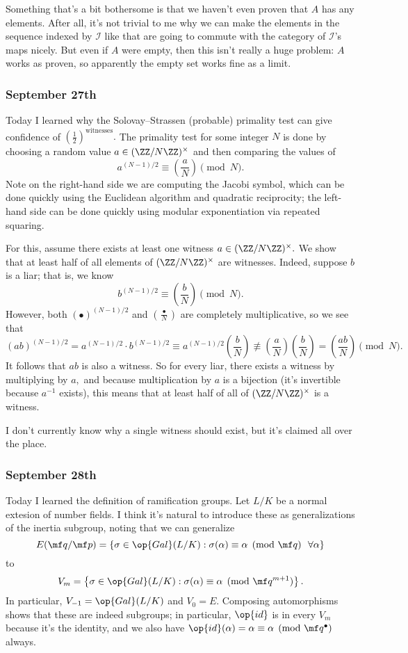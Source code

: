 Something that's a bit bothersome is that we haven't even proven that $A$ has any elements. After all, it's not trivial to me why we can make the elements in the sequence indexed by $\mathcal I$ like that are going to commute with the category of $\mathcal I$'s maps nicely. But even if $A$ were empty, then this isn't really a huge problem: $A$ works as proven, so apparently the empty set works fine as a limit.

\subsubsection{September 27th}
Today I learned why the Solovay--Strassen (probable) primality test can give confidence of $\left(\frac12\right)^{\text{witnesses}}.$ The primality test for some integer $N$ is done by choosing a random value $a\in(\ZZ/N\ZZ)^\times$ and then comparing the values of
\[a^{(N-1)/2}\equiv\left(\frac aN\right)\pmod N.\]
Note on the right-hand side we are computing the Jacobi symbol, which can be done quickly using the Euclidean algorithm and quadratic reciprocity; the left-hand side can be done quickly using modular exponentiation via repeated squaring.

For this, assume there exists at least one witness $a\in(\ZZ/N\ZZ)^\times.$ We show that at least half of all elements of $(\ZZ/N\ZZ)^\times$ are witnesses. Indeed, suppose $b$ is a liar; that is, we know
\[b^{(N-1)/2}\equiv\left(\frac bN\right)\pmod N.\]
However, both $(\bullet)^{(N-1)/2}$ and $\left(\frac\bullet N\right)$ are completely multiplicative, so we see that
\[(ab)^{(N-1)/2}=a^{(N-1)/2}\cdot b^{(N-1)/2}\equiv a^{(N-1)/2}\left(\frac bN\right)\not\equiv\left(\frac aN\right)\left(\frac bN\right)=\left(\frac{ab}N\right)\pmod N.\]
It follows that $ab$ is also a witness. So for every liar, there exists a witness by multiplying by $a,$ and because multiplication by $a$ is a bijection (it's invertible because $a^{-1}$ exists), this means that at least half of all of $(\ZZ/N\ZZ)^\times$ is a witness.

I don't currently know why a single witness should exist, but it's claimed all over the place.

\subsubsection{September 28th}
Today I learned the definition of ramification groups. Let $L/K$ be a normal extesion of number fields. I think it's natural to introduce these as generalizations of the inertia subgroup, noting that we can generalize
\[E(\mf q/\mf p)=\{\sigma\in\op{Gal}(L/K):\sigma(\alpha)\equiv\alpha\pmod{\mf q}~~\forall\alpha\}\]
to
\[V_m=\left\{\sigma\in\op{Gal}(L/K):\sigma(\alpha)\equiv\alpha\pmod{\mf q^{m+1}}\right\}.\]
In particular, $V_{-1}=\op{Gal}(L/K)$ and $V_0=E.$ Composing automorphisms shows that these are indeed subgroups; in particular, $\op{id}$ is in every $V_m$ because it's the identity, and we also have $\op{id}(\alpha)=\alpha\equiv\alpha\pmod{\mf q^\bullet}$ always.

